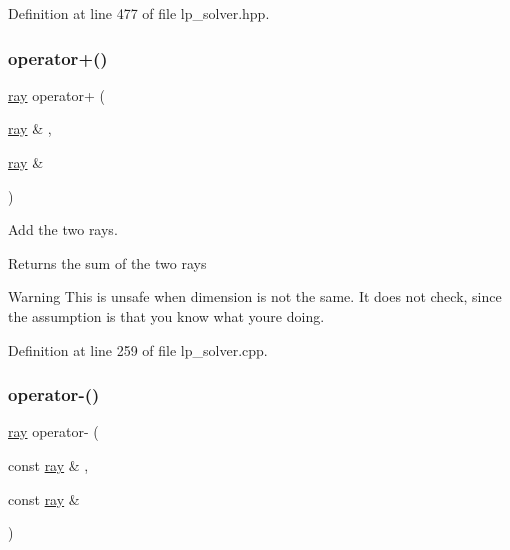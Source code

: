 Definition at line 477 of file lp\+\_\+solver.\+hpp.

\mbox{\label{group___c_l_s_solvers_gaaa48bb668551858c8d53e230546042ba}} 
\subsubsection{\texorpdfstring{operator+()}{operator+()}}
{\footnotesize\ttfamily \hyperlink{group___c_l_s_solvers_classray}{ray} operator+ (\begin{DoxyParamCaption}\item[{\hyperlink{group___c_l_s_solvers_classray}{ray} \&}]{,  }\item[{\hyperlink{group___c_l_s_solvers_classray}{ray} \&}]{ }\end{DoxyParamCaption})}



Add the two rays. 

\begin{DoxyReturn}{Returns}
the sum of the two rays 
\end{DoxyReturn}
\begin{DoxyWarning}{Warning}
This is unsafe when dimension is not the same. It does not check, since the assumption is that you know what you\textquotesingle{}re doing. 
\end{DoxyWarning}


Definition at line 259 of file lp\+\_\+solver.\+cpp.

\mbox{\label{group___c_l_s_solvers_gafcb092cfc55771c4303f540cb7697a40}} 
\subsubsection{\texorpdfstring{operator-\/()}{operator-()}}
{\footnotesize\ttfamily \hyperlink{group___c_l_s_solvers_classray}{ray} operator-\/ (\begin{DoxyParamCaption}\item[{const \hyperlink{group___c_l_s_solvers_classray}{ray} \&}]{,  }\item[{const \hyperlink{group___c_l_s_solvers_classray}{ray} \&}]{ }\end{DoxyParamCaption})}




